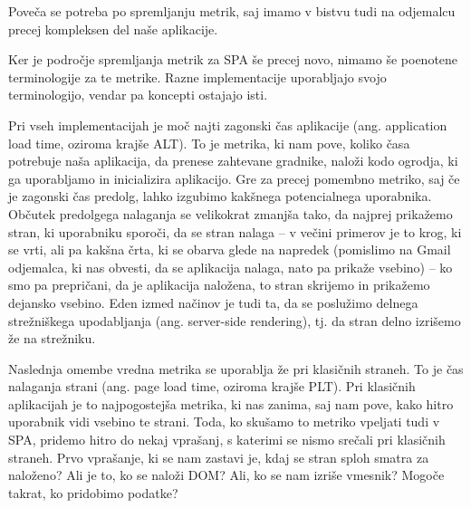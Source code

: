 \documentclass[a4paper, 12pt]{book}
\begin{document}
Poveča se potreba po spremljanju metrik, saj imamo v bistvu tudi na odjemalcu precej kompleksen del naše aplikacije.

Ker je področje spremljanja metrik za SPA še precej novo, nimamo še poenotene terminologije za te metrike. Razne implementacije \cite{linkedin_rum}\cite{mezzurite_website} uporabljajo svojo terminologijo, vendar pa koncepti ostajajo isti.

Pri vseh implementacijah je moč najti zagonski čas aplikacije (ang. application load time, oziroma krajše ALT). To je metrika, ki nam pove, koliko časa potrebuje naša aplikacija, da prenese zahtevane gradnike, naloži kodo ogrodja, ki ga uporabljamo in inicializira aplikacijo. Gre za precej pomembno metriko, saj če je zagonski čas predolg, lahko izgubimo kakšnega potencialnega uporabnika. Občutek predolgega nalaganja se velikokrat zmanjša tako, da najprej prikažemo stran, ki uporabniku sporoči, da se stran nalaga – v večini primerov je to krog, ki se vrti, ali pa kakšna črta, ki se obarva glede na napredek (pomislimo na Gmail odjemalca, ki nas obvesti, da se aplikacija nalaga, nato pa prikaže vsebino) – ko smo pa prepričani, da je aplikacija naložena, to stran skrijemo in prikažemo dejansko vsebino. Eden izmed načinov je tudi ta, da se poslužimo delnega strežniškega upodabljanja (ang. server-side rendering), tj. da stran delno izrišemo že na strežniku.

Naslednja omembe vredna metrika se uporablja že pri klasičnih straneh. To je čas nalaganja strani (ang. page load time, oziroma krajše PLT). Pri klasičnih aplikacijah je to najpogostejša metrika, ki nas zanima, saj nam pove, kako hitro uporabnik vidi vsebino te strani. Toda, ko skušamo to metriko vpeljati tudi v SPA, pridemo hitro do nekaj vprašanj, s katerimi se nismo srečali pri klasičnih straneh. Prvo vprašanje, ki se nam zastavi je, kdaj se stran sploh smatra za naloženo? Ali je to, ko se naloži DOM? Ali, ko se nam izriše vmesnik? Mogoče takrat, ko pridobimo podatke?
\end{document}
